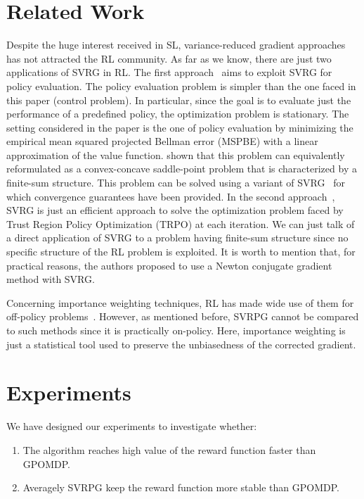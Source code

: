 \documentclass{article}
\makeatletter
\theoremstyle{remark}
\theoremstyle{definition}
\DeclareRobustCommand{\eg}{e.g.,\@\xspace}
\makeatother
\begin{document}
\section{Related Work}
Despite the huge interest received in SL, variance-reduced gradient approaches has not attracted the RL community.
As far as we know, there are just two applications of SVRG in RL.
The first approach~\citep{du2017svrgpe} aims to exploit SVRG for policy evaluation.
The policy evaluation problem is simpler than the one faced in this paper (control problem).
In particular, since the goal is to evaluate just the performance of a predefined policy, the optimization problem is stationary.
The setting considered in the paper is the one of policy evaluation by minimizing the empirical mean squared projected Bellman error (MSPBE) with a linear approximation of the value function. \citet{du2017svrgpe} shown that this problem can equivalently reformulated as a convex-concave saddle-point problem that is characterized by a finite-sum structure.
This problem can be solved using a variant of SVRG~\citep{Palaniappan2016svrgsaddle} for which convergence guarantees have been provided.
In the second approach~\citep{xu2017svrgtrpo}, SVRG is just an efficient approach to solve the optimization problem faced by Trust Region Policy Optimization (TRPO) at each iteration. We can just talk of a direct application of SVRG to a problem having finite-sum structure since no specific structure of the RL problem is exploited.
It is worth to mention that, for practical reasons, the authors proposed to use a Newton conjugate gradient method with SVRG.

Concerning importance weighting techniques, RL has made wide use of them for off-policy problems~\citep[\eg]{precup2000eligibility,thomas2015high}. However, as mentioned before, SVRPG cannot be compared to such methods since it is practically on-policy. Here, importance weighting is just a statistical tool used to preserve the unbiasedness of the corrected gradient.


\section{Experiments}\label{sec:exp}
We have designed our experiments to investigate whether:
\begin{enumerate}
\item The algorithm reaches high value of the reward function faster than GPOMDP.
\item Averagely SVRPG keep the reward function more stable than GPOMDP.
\end{enumerate}
\end{document}
